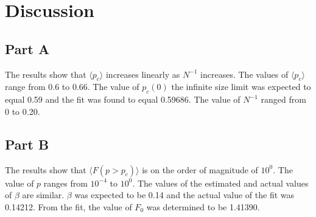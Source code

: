 \documentclass[12pt]{article}
\begin{document}
\section{Discussion}

\subsection{Part A}
\indent \indent The results show that $\langle p_c\rangle$ increases linearly as $N^{-1}$ increases. The values of $\langle p_c\rangle$ range from 0.6 to 0.66. The value of $p_c(0)$ the infinite size limit was expected to equal 0.59 and the fit was found to equal 0.59686. The value of $N^{-1}$ ranged from 0 to 0.20.

\subsection{Part B}
\indent \indent The results show that $\langle F(p>p_c) \rangle$ is on the order of magnitude of $10^0$. The value of $p$ ranges from $10^{-4}$ to $10^0$. The values of the estimated and actual values of $\beta$ are similar. $\beta$ was expected to be 0.14 and the actual value of the fit was 0.14212. From the fit, the value of $F_0$ was determined to be 1.41390.
\end{document}
